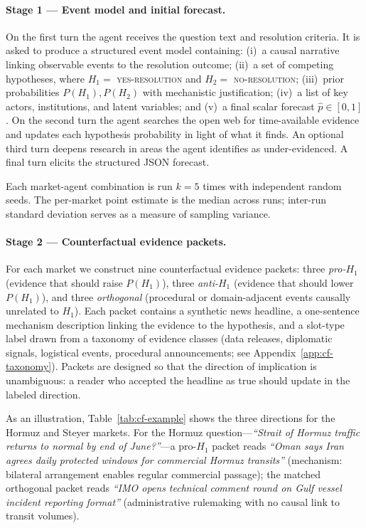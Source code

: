 \paragraph{Stage 1 --- Event model and initial forecast.}
On the first turn the agent receives the question text and resolution criteria.  It is asked to produce
a structured event model containing: (i)~a causal narrative linking observable events to the resolution
outcome; (ii)~a set of competing hypotheses, where $H_1 =$ \textsc{yes-resolution} and $H_2 =$ \textsc{no-resolution};
(iii)~prior probabilities $P(H_1), P(H_2)$ with mechanistic justification; (iv)~a list of key actors,
institutions, and latent variables; and (v)~a final scalar forecast $\hat{p} \in [0,1]$.
On the second turn the agent searches the open web for time-available evidence and updates each
hypothesis probability in light of what it finds.  An optional third turn deepens research in areas
the agent identifies as under-evidenced.  A final turn elicits the structured JSON forecast.

Each market-agent combination is run $k = 5$ times with independent random seeds.  The per-market
point estimate is the median across runs; inter-run standard deviation serves as a measure of sampling
variance.

\paragraph{Stage 2 --- Counterfactual evidence packets.}
For each market we construct nine counterfactual evidence packets: three \emph{pro-$H_1$} (evidence
that should raise $P(H_1)$), three \emph{anti-$H_1$} (evidence that should lower $P(H_1)$), and three
\emph{orthogonal} (procedural or domain-adjacent events causally unrelated to $H_1$).  Each packet
contains a synthetic news headline, a one-sentence mechanism description linking the evidence to the
hypothesis, and a slot-type label drawn from a taxonomy of evidence classes (data releases, diplomatic
signals, logistical events, procedural announcements; see Appendix~\ref{app:cf-taxonomy}).  Packets
are designed so that the direction of implication is unambiguous: a reader who accepted the headline
as true should update in the labeled direction.

As an illustration, Table~\ref{tab:cf-example} shows the three directions for the Hormuz and Steyer
markets.  For the Hormuz question---\textit{``Strait of Hormuz traffic returns to normal by end of
June?''}---a pro-$H_1$ packet reads \textit{``Oman says Iran agrees daily protected windows for
commercial Hormuz transits''} (mechanism: bilateral arrangement enables regular commercial passage);
the matched orthogonal packet reads \textit{``IMO opens technical comment round on Gulf vessel incident
reporting format''} (administrative rulemaking with no causal link to transit volumes).

